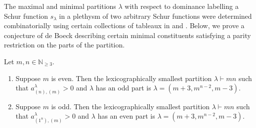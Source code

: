 \documentclass[ALCO, Unicode]{cedram}
\newcommand{\N}{\mathbb{N}}
\begin{document}
The maximal and minimal partitions $\lambda$ with respect to dominance labelling a Schur function $s_\lambda$ in a plethysm of two arbitrary Schur functions were determined combinatorially using certain collections of tableaux in \cite{PW} and \cite{dBPW}. Below, we prove a conjecture of de Boeck \cite[Conjecture 6.5.2]{dB-thesis} describing certain minimal constituents satisfying a parity restriction on the parts of the partition.

\begin{theorem}\label{thm:6.5.2}
	Let $m,n\in\N_{\ge 3}$.
	\begin{enumerate}[label=\textup{(\alph*)}]
		\item Suppose $m$ is even. Then the lexicographically smallest partition $\lambda\vdash mn$ such that $a^\lambda_{(n),(m)}>0$ and $\lambda$ has an odd part is $\lambda=(m+3,m^{n-2},m-3)$.
		\item Suppose $m$ is odd. Then the lexicographically smallest partition $\lambda\vdash mn$ such that $a^\lambda_{(1^n),(m)}>0$ and $\lambda$ has an even part is $\lambda=(m+3,m^{n-2},m-3)$.
	\end{enumerate}
\end{theorem}
\end{document}
